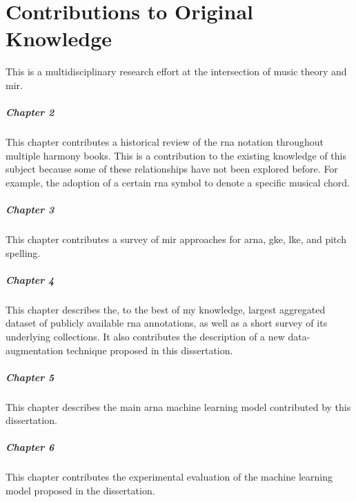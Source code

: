 \chapter*{Contributions to Original Knowledge}
\label{chap:contributionstoknowledge}

This \thesisdiss{} is a multidisciplinary research effort at
the intersection of music theory and \gls{mir}.

\paragraph{Chapter 2}

This chapter contributes a historical review of the
\gls{rna} notation throughout multiple harmony books. This
is a contribution to the existing knowledge of this subject
because some of these relationships have not been explored
before. For example, the adoption of a certain \gls{rna}
symbol to denote a specific musical chord.

\paragraph{Chapter 3}

This chapter contributes a survey of \gls{mir} approaches
for \gls{arna}, \gls{gke}, \gls{lke}, and pitch spelling. 

\paragraph{Chapter 4}

This chapter describes the, to the best of my knowledge,
largest aggregated dataset of publicly available \gls{rna}
annotations, as well as a short survey of its underlying
collections. It also contributes the description of a new
data-augmentation technique proposed in this dissertation.

\paragraph{Chapter 5}

This chapter describes the main \gls{arna} machine learning
model contributed by this dissertation.

\paragraph{Chapter 6}

This chapter contributes the experimental evaluation of the
machine learning model proposed in the dissertation. 
